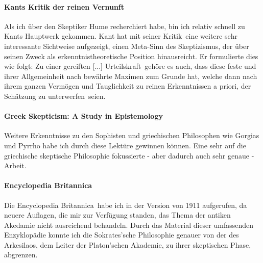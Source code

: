 \documentclass[12pt,a4paper,final]{article}
\begin{document}
\paragraph{Kants \glqq Kritik der reinen Vernunft\grqq\ \cite{kritik}} Als ich über den Skeptiker Hume recherchiert habe, bin ich relativ schnell zu Kants Hauptwerk gekommen. Kant hat mit seiner \glqq Kritik\grqq\ eine weitere sehr interessante Sichtweise aufgezeigt, einen Meta-Sinn des Skeptizismus, der über seinen Zweck als erkenntnistheoretische Position hinausreicht. Er formulierte dies wie folgt: Zu einer \glqq gereiften [...] Urteilskraft\grqq\ gehöre es auch, dass diese \glqq feste und ihrer Allgemeinheit nach bewährte Maximen zum Grunde hat\grqq, welche dann \glqq nach ihrem ganzen Vermögen und Tauglichkeit zu reinen Erkenntnissen a priori, der Schätzung zu unterwerfen\grqq\ seien.
\paragraph*{Greek Skepticism: A Study in Epistemology \cite{greek_stough}} Weitere Erkenntnisse zu den Sophisten und griechischen Philosophen wie Gorgias und Pyrrho habe ich durch diese Lektüre gewinnen können. Eine sehr auf die griechische skeptische Philosophie fokussierte - aber dadurch auch sehr genaue - Arbeit.
\paragraph*{Encyclopedia Britannica \cite{enc_brit}} Die \glqq Encyclopedia Britannica\grqq\ habe ich in der Version von 1911 aufgerufen, da neuere Auflagen, die mir zur Verfügung standen, das Thema der antiken Akedamie nicht ausreichend behandeln. Durch das Material dieser umfassenden Enzyklopädie konnte ich die Sokrates'sche Philosophie genauer von der des Arkesilaos, dem Leiter der Platon'schen Akademie, zu ihrer skeptischen Phase, abgrenzen.
\nocite{*}
\pagebreak
\printbibliography
\end{document}
